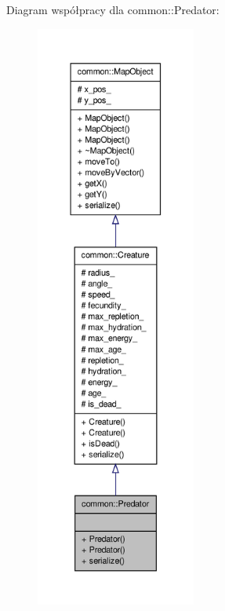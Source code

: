 Diagram współpracy dla common\-:\-:Predator\-:
\nopagebreak
\begin{figure}[H]
\begin{center}
\leavevmode
\includegraphics[height=550pt]{classcommon_1_1Predator__coll__graph}
\end{center}
\end{figure}
